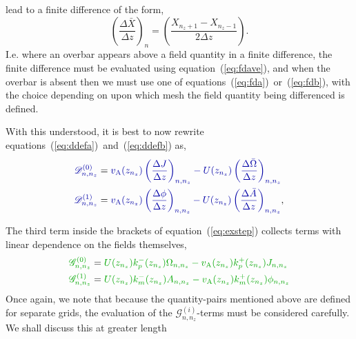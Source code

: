 \documentclass[12pt, letterpaper, oneside, leqno, openright]{memoir}
\newcommand{\dfield}{\mathscr{D}}
\newcommand{\gfield}{\mathscr{G}}
\begin{document}
lead to a finite difference of the form,
%
\begin{equation}
  \left(\frac{\Delta \bar X}{\Delta z}\right)_n = \left(\frac{X_{n_z + 1} - X_{n_z-1}}{2\Delta z}\right).
  \label{eq:fdave}
\end{equation}
%
I.e. where an overbar appears above a field quantity in a finite
difference, the finite difference must be evaluated using
equation~(\ref{eq:fdave}), and when the overbar is absent then
we must use one of equations~(\ref{eq:fda})~or~(\ref{eq:fdb}),
with the choice depending on upon which mesh the field quantity
being differenced is defined.
%
\par
%
With this understood, it is best to now rewrite
equations~(\ref{eq:ddefa})~and~(\ref{eq:ddefb}) as,
%
\begin{subequations}
\begin{align}
%
  {\color{blue!65!black}\dfield^{(0)}_{n,n_z}} &= 
%
  {\color{blue!65!black}
     \magvalfven(z_{n_z})\left(\frac{\Delta  J}{\Delta z}\right)_{n,n_z} 
    - U(z_{n_z})\left(\frac{\Delta \bar\Omega}{\Delta z}\right)_{n,n_z}
  } \label{eq:ddefa} \\
%
  {\color{blue!65!black}\dfield^{(1)}_{n,n_z}} &= 
%
  {\color{blue!65!black}
    \magvalfven(z_{n_z})\left(\frac{\Delta \phi}{\Delta z}\right)_{n,n_z}
   - U(z_{n_z})\left(\frac{\Delta \bar A}{\Delta z}\right)_{n,n_z}
  },\label{eq:ddefb}
%
\end{align}
\end{subequations}
%
\par
%
The third term inside the brackets of equation~(\ref{eq:exstep}) collects 
terms with linear dependence on the fields themselves,
%
\begin{subequations}
\begin{align}
%
  { \color{green!65!black}\gfield^{(0)}_{n,n_z}} &= 
%
  {\color{green!65!black}
    U(z_{n_z})\kpm(z_{n_z})\Omega_{n,n_z} - \magvalfven(z_{n_z})\kpp(z_{n_{z}}) J_{n,n_z}   
  } 
  \label{eq:ldefa} \\
%
  {\color{green!65!black}\gfield^{(1)}_{n,n_z}} &= 
%
  {\color{green!65!black}
    U(z_{n_z})\kmm(z_{n_z}) A_{n,n_z}     - \magvalfven(z_{n_z})\kmp(z_{n_z})  \phi_{n,n_z} 
  } 
   \label{eq:ldefb}
%
\end{align}
\end{subequations}
%
Once again, we note that because the quantity-pairs mentioned above are
defined for separate grids, the evaluation of the 
{\color{green!65!black}$\gfield^{(i)}_{n,n_z}$}-terms 
must be considered carefully. We shall discuss this at greater length 
\end{document}
